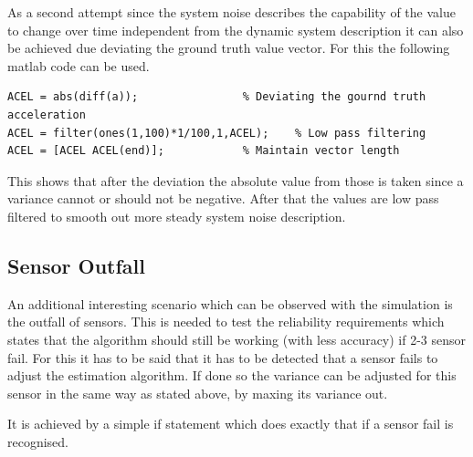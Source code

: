 As a second attempt since the system noise describes the capability of the value to change over time independent from the dynamic system description 
it can also be achieved due deviating the ground truth value vector.
For this the following matlab code can be used.
\begin{lstlisting}[caption={System noise generation with deviation}]
ACEL = abs(diff(a));				% Deviating the gournd truth acceleration
ACEL = filter(ones(1,100)*1/100,1,ACEL);	% Low pass filtering
ACEL = [ACEL ACEL(end)];			% Maintain vector length
\end{lstlisting}
This shows that after the deviation the absolute value from those is taken since a variance cannot or should not be negative.
After that the values are low pass filtered to smooth out more steady system noise description.

\subsection{Sensor Outfall}

An additional interesting scenario which can be observed with the simulation is the outfall of sensors.
This is needed to test the reliability requirements which states that the algorithm should still be working (with less accuracy) if 2-3 sensor fail.
For this it has to be said that it has to be detected that a sensor fails to adjust the estimation algorithm.
If done so the variance can be adjusted for this sensor in the same way as stated above, by maxing its variance out.

It is achieved by a simple if statement which does exactly that if a sensor fail is recognised.

